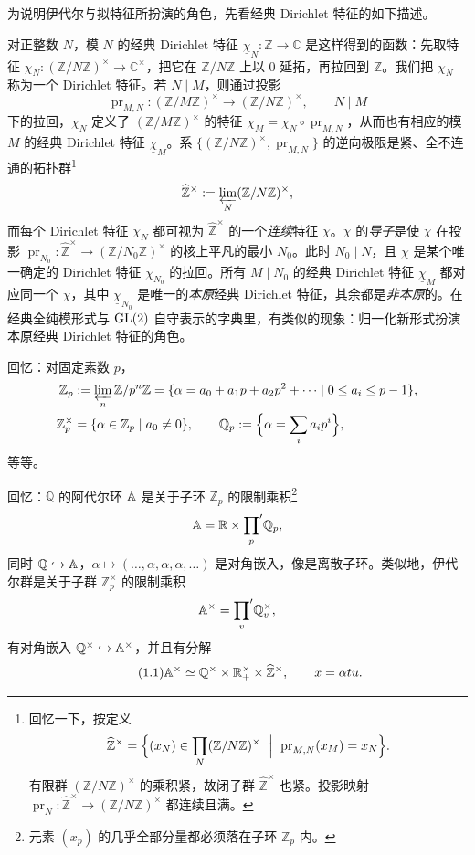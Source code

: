 为说明伊代尔与拟特征所扮演的角色，先看经典 Dirichlet 特征的如下描述。

对正整数 $N$，模 $N$ 的经典 Dirichlet 特征 $\underline\chi_N:\mathbb Z\to\mathbb C$ 是这样得到的函数：先取特征 $\chi_N:(\mathbb Z/N\mathbb Z)^\times\to\mathbb C^\times$，把它在 $\mathbb Z/N\mathbb Z$ 上以 $0$ 延拓，再拉回到 $\mathbb Z$。我们把 $\chi_N$ 称为一个 Dirichlet 特征。若 $N\mid M$，则通过投影
\[
\operatorname{pr}_{M,N}:(\mathbb Z/M\mathbb Z)^\times\longrightarrow(\mathbb Z/N\mathbb Z)^\times,\qquad N\mid M
\]
下的拉回，$\chi_N$ 定义了 $(\mathbb Z/M\mathbb Z)^\times$ 的特征 $\chi_M=\chi_N\circ\operatorname{pr}_{M,N}$，从而也有相应的模 $M$ 的经典 Dirichlet 特征 $\underline\chi_M$。系 $\{(\mathbb Z/N\mathbb Z)^\times,\operatorname{pr}_{M,N}\}$ 的逆向极限是紧、全不连通的拓扑群\footnote{回忆一下，按定义
\[
\widehat{\mathbb Z}^\times=\Bigl\{(x_N)\in\prod_N(\mathbb Z/N\mathbb Z)^\times\ \Bigm|\ \operatorname{pr}_{M,N}(x_M)=x_N\Bigr\}.
\]
有限群 $(\mathbb Z/N\mathbb Z)^\times$ 的乘积紧，故闭子群 $\widehat{\mathbb Z}^\times$ 也紧。投影映射 $\operatorname{pr}_N:\widehat{\mathbb Z}^\times\to(\mathbb Z/N\mathbb Z)^\times$ 都连续且满。}
\[
\widehat{\mathbb Z}^\times:=\varprojlim_N(\mathbb Z/N\mathbb Z)^\times,
\]
而每个 Dirichlet 特征 $\chi_N$ 都可视为 $\widehat{\mathbb Z}^\times$ 的一个\emph{连续}特征 $\chi$。$\chi$ 的\emph{导子}是使 $\chi$ 在投影 $\operatorname{pr}_{N_0}:\widehat{\mathbb Z}^\times\to(\mathbb Z/N_0\mathbb Z)^\times$ 的核上平凡的最小 $N_0$。此时 $N_0\mid N$，且 $\chi$ 是某个唯一确定的 Dirichlet 特征 $\chi_{N_0}$ 的拉回。所有 $M\mid N_0$ 的经典 Dirichlet 特征 $\underline\chi_M$ 都对应同一个 $\chi$，其中 $\underline\chi_{N_0}$ 是唯一的\emph{本原}经典 Dirichlet 特征，其余都是\emph{非本原}的。在经典全纯模形式与 $\mathrm{GL}(2)$ 自守表示的字典里，有类似的现象：归一化新形式扮演本原经典 Dirichlet 特征的角色。

回忆：对固定素数 $p$，
\[
\begin{aligned}
\mathbb Z_p&:=\varprojlim_n\mathbb Z/p^n\mathbb Z
=\{\alpha=a_0+a_1p+a_2p^2+\cdots\mid 0\le a_i\le p-1\},\\
\mathbb Z_p^\times&=\{\alpha\in\mathbb Z_p\mid a_0\ne0\},\qquad
\mathbb Q_p:=\Bigl\{\alpha=\sum_i a_ip^i\Bigr\},
\end{aligned}
\]
等等。

回忆：$\mathbb Q$ 的阿代尔环 $\mathbb{A}$ 是关于子环 $\mathbb Z_p$ 的限制乘积\footnote{元素 $(x_p)$ 的几乎全部分量都必须落在子环 $\mathbb Z_p$ 内。}
\[
\mathbb{A}=\mathbb R\times{\prod_p}'\mathbb Q_p,
\]
同时 $\mathbb Q\hookrightarrow\mathbb{A}$，$\alpha\mapsto(\dots,\alpha,\alpha,\alpha,\dots)$ 是对角嵌入，像是离散子环。类似地，伊代尔群是关于子群 $\mathbb Z_p^\times$ 的限制乘积
\[
\mathbb{A}^\times={\prod_v}'\mathbb Q_v^\times,
\]
有对角嵌入 $\mathbb Q^\times\hookrightarrow\mathbb{A}^\times$，并且有分解
\begin{equation*}\tag{1.1}
\mathbb{A}^\times\simeq\mathbb Q^\times\times\mathbb R^\times_+\times\widehat{\mathbb Z}^\times,\qquad x=\alpha tu.
\end{equation*}

